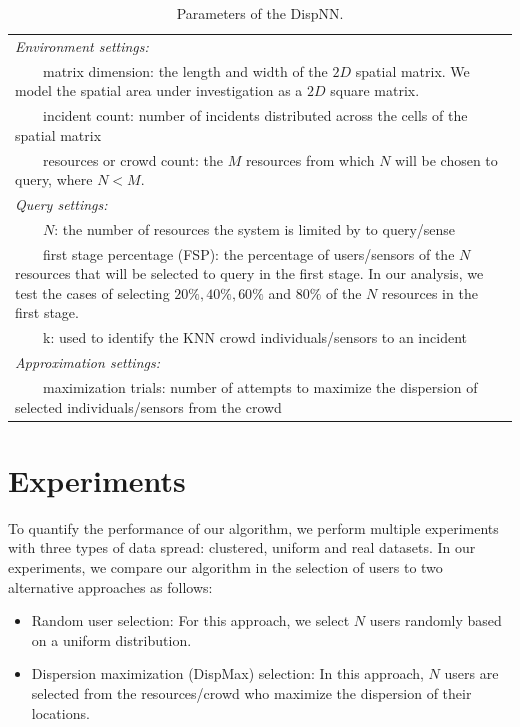 \documentclass{acm_proc_article-sp}
\newcommand{\tabitem}{~~\llap{\textbullet}~~}
\begin{document}
\begin{table}{}
\centering
\begin{tabulary}{0.5\textwidth}{|L|}
\hline
\textit{Environment settings: }\\
\tabitem matrix dimension: the length and width of the $2D$ spatial matrix. We model the spatial area under investigation as a $2D$ square matrix.\\
\tabitem incident count: number of incidents distributed across the cells of the spatial matrix\\
\tabitem resources or crowd count: the $M$ resources from which $N$ will be chosen to query, where $N < M$.\\
\hline
\textit{Query settings:}\\
\tabitem $N$: the number of resources the system is limited by to query/sense \\
\tabitem first stage percentage (FSP): the percentage of users/sensors of the $N$ resources that will be selected to query in the first stage. In our analysis, we test the cases of selecting $20\%, 40\%, 60\%$ and $80\%$ of the $N$ resources in the first stage.\\
\tabitem k: used to identify the KNN crowd individuals/sensors to an incident\\
\hline
\textit{Approximation settings: }\\
\tabitem maximization trials: number of attempts to maximize the dispersion of selected individuals/sensors from the crowd\\
\hline
\end{tabulary}
\caption{Parameters of the DispNN.}
\label{table:systemParameters}
\end{table}

\section{Experiments}
To quantify the performance of our algorithm, we perform multiple experiments with three types of data spread: clustered, uniform and real datasets. In our experiments, we compare our algorithm in the selection of users to two alternative approaches as follows:
\begin{itemize}
\item Random user selection: For this approach, we select $N$ users randomly based on a uniform distribution.
\item Dispersion maximization (DispMax) selection: In this approach, $N$ users are selected from the resources/crowd who maximize the dispersion of their locations.
\end{itemize}
\end{document}
